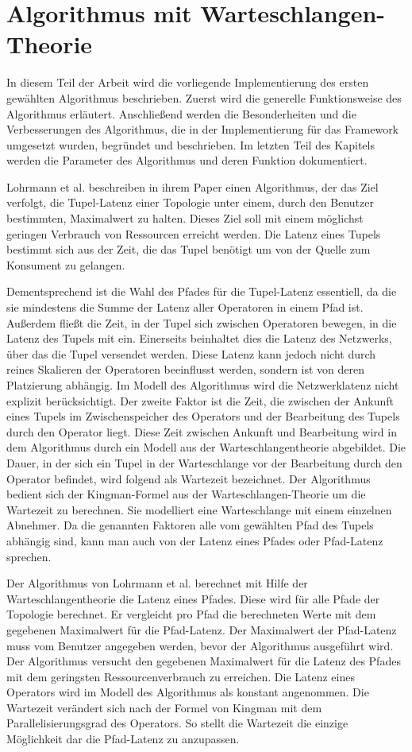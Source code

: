 \chapter{Algorithmus mit Warteschlangen-Theorie}

In diesem Teil der Arbeit wird die vorliegende Implementierung des ersten gewählten Algorithmus beschrieben.
Zuerst wird die generelle Funktionsweise des Algorithmus erläutert.
Anschließend werden die Besonderheiten und die Verbesserungen des Algorithmus, die in der Implementierung für das Framework umgesetzt wurden, begründet und beschrieben.
Im letzten Teil des Kapitels werden die Parameter des Algorithmus und deren Funktion dokumentiert.

Lohrmann et al. beschreiben in ihrem Paper \cite{lohrmann_elastic_2015} einen Algorithmus, der das Ziel verfolgt, die Tupel-Latenz einer Topologie unter einem, durch den Benutzer bestimmten, Maximalwert zu halten.
Dieses Ziel soll mit einem möglichst geringen Verbrauch von Ressourcen erreicht werden.
Die Latenz eines Tupels bestimmt sich aus der Zeit, die das Tupel benötigt um von der Quelle zum Konsument zu gelangen.

Dementsprechend ist die Wahl des Pfades für die Tupel-Latenz essentiell, da die sie mindestens die Summe der Latenz aller Operatoren in einem Pfad ist.
Außerdem fließt die Zeit, in der Tupel sich zwischen Operatoren bewegen, in die Latenz des Tupels mit ein.
Einerseits beinhaltet dies die Latenz des Netzwerks, über das die Tupel versendet werden.
Diese Latenz kann jedoch nicht durch reines Skalieren der Operatoren beeinflusst werden, sondern ist von deren Platzierung abhängig.
Im Modell des Algorithmus wird die Netzwerklatenz nicht explizit berücksichtigt.
Der zweite Faktor ist die Zeit, die zwischen der Ankunft eines Tupels im Zwischenspeicher des Operators und der Bearbeitung des Tupels durch den Operator liegt.
Diese Zeit zwischen Ankunft und Bearbeitung wird in dem Algorithmus durch ein Modell aus der Warteschlangentheorie abgebildet.
Die Dauer, in der sich ein Tupel in der Warteschlange vor der Bearbeitung durch den Operator befindet, wird folgend als Wartezeit bezeichnet.
Der Algorithmus bedient sich der Kingman-Formel aus der Warteschlangen-Theorie um die Wartezeit zu berechnen.
Sie modelliert eine Warteschlange mit einem einzelnen Abnehmer.
Da die genannten Faktoren alle vom gewählten Pfad des Tupels abhängig sind, kann man auch von der Latenz eines Pfades oder Pfad-Latenz sprechen.

Der Algorithmus von Lohrmann et al. berechnet mit Hilfe der Warteschlangentheorie die Latenz eines Pfades.
Diese wird für alle Pfade der Topologie berechnet.
Er vergleicht pro Pfad die berechneten Werte mit dem gegebenen Maximalwert für die Pfad-Latenz.
Der Maximalwert der Pfad-Latenz muss vom Benutzer angegeben werden, bevor der Algorithmus ausgeführt wird.
Der Algorithmus versucht den gegebenen Maximalwert für die Latenz des Pfades mit dem geringsten Ressourcenverbrauch zu erreichen.
Die Latenz eines Operators wird im Modell des Algorithmus als konstant angenommen. 
Die Wartezeit verändert sich nach der Formel von Kingman mit dem Parallelisierungsgrad des Operators.
So stellt die Wartezeit die einzige Möglichkeit dar die Pfad-Latenz zu anzupassen.

